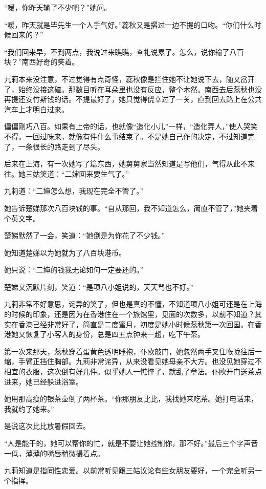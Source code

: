 \par “嗳，你昨天输了不少吧？”她问。
\par “嗳，昨天就是毕先生一个人手气好。”蕊秋又是撂过一边不提的口吻。“你们什么时候回来的？”
\par “我们回来早，不到两点，我说过来瞧瞧，查礼说累了。怎么，说你输了八百块？”南西好奇的笑着。
\par 九莉本来没注意，不过觉得有点奇怪，蕊秋像是拦住她不让她说下去，随又岔开了，始终没接这碴。那数目听在耳朵里也没有反应，整个木然。南西去后蕊秋也没再提还安竹斯钱的话。不提最好了，她只觉得侥幸过了一关，直到回去路上在公共汽车上才明白过来。
\par 偏偏刚巧八百。如果有上帝的话，也就像“造化小儿”一样，“造化弄人，”使人哭笑不得。一回过味来，就像有件什么事结束了。不是她自己作的决定，不过知道完了，一条很长的路走到了尽头。
\par 后来在上海，有一次她写了篇东西，她舅舅家当然知道是写他们，气得从此不来往。她三姑笑道：“二婶回来要生气了。”
\par 九莉道：“二婶怎么想，我现在完全不管了。”
\par 她告诉楚娣那次八百块钱的事。“自从那回，我不知道怎么，简直不管了，”她夹着个英文字。
\par 楚娣默然了一会，笑道：“她倒是为你花了不少钱。”
\par 她知道楚娣以为她就为了八百块港币。
\par 她只说：“二婶的钱我无论如何一定要还的。”
\par 楚娣又沉默片刻，笑道：“是项八小姐说的，天天骂也不好。”
\par 九莉非常不好意思，诧异的笑了，但也是真的不懂，不知道项八小姐可还是在上海的时候的印象，还是因为在香港住在一个旅馆里，见面的次数多，以前不知道？其实在香港已经非常好了，简直是二度蜜月，初度是她小时候蕊秋第一次回国。在香港她又恢复了小客人的身份，总是四五点钟来一趟，吃下午茶。
\par 第一次来那天，蕊秋穿着蛋黄色透明睡袍，仆欧敲门，她忽然两手叉住喉咙往后一缩，手臂正挡住胸部。九莉非常诧异，从来没看见她母亲不大方。也没见她穿过不相宜的衣服，这次倒有好几件。似乎她人一憔悴了，就乱了章法。仆欧开门送茶点进来，她已经躲进浴室。
\par 她用那高瘦的银茶壶倒了两杯茶。“你那朋友比比，我找她来吃茶。她打电话来，我就约了她来。”
\par 是说这次比比放暑假回去。
\par “人是能干的，她可以帮你的忙，就是不要让她控制你，那不好。”最后三个字声音一低，薄薄的嘴唇稍微撮着点。
\par 九莉知道是指同性恋爱。以前常听见跟三姑议论有些女朋友要好，一个完全听另一个指挥。
